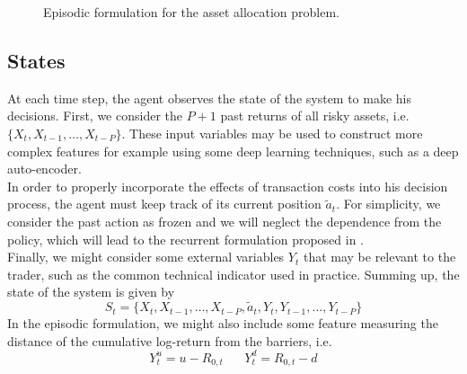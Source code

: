 \begin{figure}[t]
\centering 
{}
\caption{Episodic formulation for the asset allocation problem.}
\label{fig:episodic_asset_alloc}
\end{figure}

\subsection{States}
At each time step, the agent observes the state of the system to make his decisions. First, we consider the $P+1$ past returns of all risky assets, i.e. $\{X_t, X_{t-1}, \ldots, X_{t-P}\}$. These input variables may be used to construct more complex features for example using some deep learning techniques, such as a deep auto-encoder.\\
In order to properly incorporate the effects of transaction costs into his decision process, the agent must keep track of its current position $\tilde{a}_t$. For simplicity, we consider the past action as frozen and we will neglect the dependence from the policy, which will lead to the recurrent formulation proposed in \cite{moody1997optimization}.\\
Finally, we might consider some external variables $Y_t$ that may be relevant to the trader, such as the common technical indicator used in practice. Summing up, the state of the system is given by
\begin{equation}
	S_t = \{X_t, X_{t-1}, \ldots, X_{t-P}, \tilde{a}_t, Y_t, Y_{t-1}, \ldots,
	Y_{t-P}\}
\end{equation}
In the episodic formulation, we might also include some feature measuring the distance of the cumulative log-return from the barriers, i.e.
\begin{equation}
	Y_t^u = u - R_{0,t} \;\;\;\;\;\; Y_t^d = R_{0,t} - d
\end{equation}

